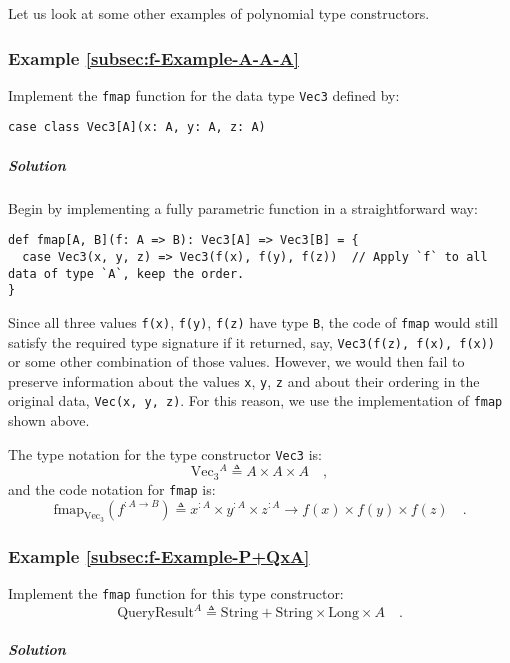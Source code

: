 Let us look at some other examples of polynomial type constructors.

\subsubsection{Example \label{subsec:f-Example-A-A-A}\ref{subsec:f-Example-A-A-A}}

Implement the \lstinline!fmap! function for the data type \lstinline!Vec3!
defined by:
\begin{lstlisting}
case class Vec3[A](x: A, y: A, z: A)
\end{lstlisting}


\subparagraph{Solution}

Begin by implementing a fully parametric function in a straightforward
way:
\begin{lstlisting}
def fmap[A, B](f: A => B): Vec3[A] => Vec3[B] = {
  case Vec3(x, y, z) => Vec3(f(x), f(y), f(z))  // Apply `f` to all data of type `A`, keep the order.
}
\end{lstlisting}
Since all three values \lstinline!f(x)!, \lstinline!f(y)!, \lstinline!f(z)!
have type \lstinline!B!, the code of \lstinline!fmap! would still
satisfy the required type signature if it returned, say, \lstinline!Vec3(f(z), f(x), f(x))!
or some other combination of those values. However, we would then
fail to preserve information about the values \lstinline!x!, \lstinline!y!,
\lstinline!z! and about their ordering in the original data, \lstinline!Vec(x, y, z)!.
For this reason, we use the implementation of \lstinline!fmap! shown
above.

The type notation for the type constructor \lstinline!Vec3! is:
\[
\text{Vec}_{3}{}^{A}\triangleq A\times A\times A\quad,
\]
and the code notation for \lstinline!fmap! is:
\[
\text{fmap}_{\text{Vec}_{3}}(f^{:A\rightarrow B})\triangleq x^{:A}\times y^{:A}\times z^{:A}\rightarrow f(x)\times f(y)\times f(z)\quad.
\]


\subsubsection{Example \label{subsec:f-Example-P+QxA}\ref{subsec:f-Example-P+QxA}}

Implement the \lstinline!fmap! function for this type constructor:
\[
\text{QueryResult}^{A}\triangleq\text{String}+\text{String}\times\text{Long}\times A\quad.
\]


\subparagraph{Solution}

